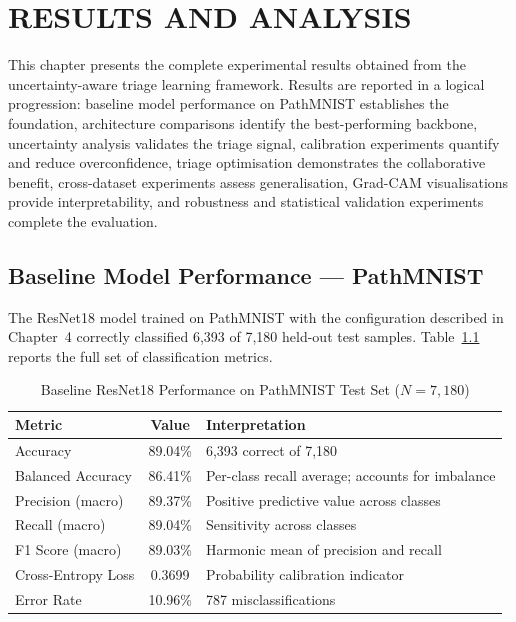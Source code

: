 
\chapter{RESULTS AND ANALYSIS}

This chapter presents the complete experimental results obtained from the uncertainty-aware triage learning framework. Results are reported in a logical progression: baseline model performance on PathMNIST establishes the foundation, architecture comparisons identify the best-performing backbone, uncertainty analysis validates the triage signal, calibration experiments quantify and reduce overconfidence, triage optimisation demonstrates the collaborative benefit, cross-dataset experiments assess generalisation, Grad-CAM visualisations provide interpretability, and robustness and statistical validation experiments complete the evaluation.

\section{Baseline Model Performance — PathMNIST}

The ResNet18 model trained on PathMNIST with the configuration described in Chapter~4 correctly classified 6,393 of 7,180 held-out test samples. Table~\ref{tab:ch5_baseline} reports the full set of classification metrics.

\begin{table}[h]
\footnotesize
\centering
\caption{Baseline ResNet18 Performance on PathMNIST Test Set ($N = 7{,}180$)}
\label{tab:ch5_baseline}
\begin{tabular}{lcl}
\toprule
\textbf{Metric} & \textbf{Value} & \textbf{Interpretation} \\
\midrule
Accuracy             & 89.04\% & 6,393 correct of 7,180 \\
Balanced Accuracy    & 86.41\% & Per-class recall average; accounts for imbalance \\
Precision (macro)    & 89.37\% & Positive predictive value across classes \\
Recall (macro)       & 89.04\% & Sensitivity across classes \\
F1 Score (macro)     & 89.03\% & Harmonic mean of precision and recall \\
Cross-Entropy Loss   & 0.3699  & Probability calibration indicator \\
Error Rate           & 10.96\% & 787 misclassifications \\
\bottomrule
\end{tabular}
\end{table}


